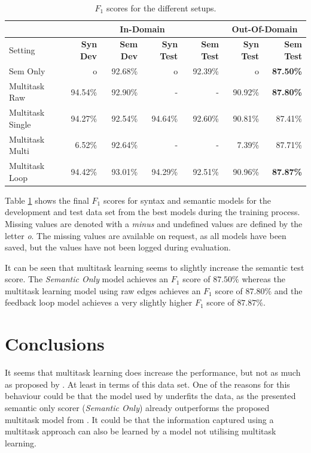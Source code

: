\documentclass[11pt]{scrartcl}
\begin{document}
\begin{table}[h]
    \centering
    \begin{tabular}{l|r|r|r|r|r|r}
         & \multicolumn{4}{c}{In-Domain} & \multicolumn{2}{c}{Out-Of-Domain} \\ \hline
        Setting & \textbf{Syn Dev} & \textbf{Sem Dev} & \textbf{Syn Test} & \textbf{Sem Test} & \textbf{Syn Test} & \textbf{Sem Test} \\ \hline
        Sem Only & o & 92.68\% &o & 92.39\% & o & \textbf{87.50\%} \\ 
        Multitask Raw & 94.54\% & 92.90\% & - & - & 90.92\% & \textbf{87.80\%} \\
        Multitask Single & 94.27\% & 92.54\% & 94.64\% & 92.60\% & 90.81\% & 87.41\% \\
        Multitask Multi & 6.52\% & 92.64\% & - & - & 7.39\% & 87.71\% \\
        Multitask Loop & 94.42\% & 93.01\% & 94.29\% & 92.51\% & 90.96\% & \textbf{87.87\%} \\
    \end{tabular}
    \caption{$F_1$ scores for the different setups.}
    \label{tab:results}
\end{table}

Table \ref{tab:results} shows the final $F_1$ scores for syntax and semantic models for the development and test data set from the best models during the training process. Missing values are denoted with a \textit{minus} and undefined values are defined by the letter \textit{o}. The missing values are available on request, as all models have been saved, but the values have not been logged during evaluation.

It can be seen that multitask learning seems to slightly increase the semantic test score. The \textit{Semantic Only} model achieves an $F_1$ score of $87.50\%$ whereas the multitask learning model using raw edges achieves an $F_1$ score of $87.80\%$ and the feedback loop model achieves a very slightly higher $F_1$ score of $87.87\%$.

\section{Conclusions}

It seems that multitask learning does increase the performance, but not as much as proposed by \cite{peng-etal-2017-deep}. At least in terms of this data set. One of the reasons for this behaviour could be that the model used by \cite{peng-etal-2017-deep} underfits the data, as the presented semantic only scorer (\textit{Semantic Only}) already outperforms the proposed multitask model from \cite{peng-etal-2017-deep}. It could be that the information captured using a multitask approach can also be learned by a model not utilising multitask learning.
\end{document}
